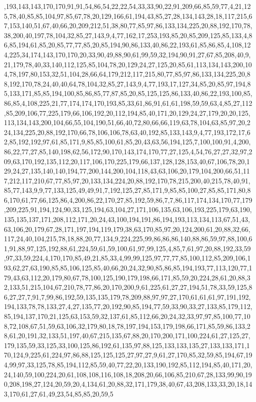 ,193,143,143,170,170,91,91,54,86,54,22,22,54,33,33,90,22,91,209,66,85,59,77,4,21,125,78,40,85,85,104,97,85,67,78,20,129,166,61,194,43,85,27,28,134,143,28,18,117,215,67,153,140,51,67,40,66,20,209,212,51,38,80,77,85,97,86,133,134,225,20,88,192,170,78,38,200,40,197,78,104,32,85,27,143,9,4,77,162,17,253,193,85,20,85,209,125,85,133,4,86,85,194,61,85,20,85,77,77,85,20,85,194,90,86,133,40,86,22,193,61,85,86,85,4,108,124,225,34,174,143,170,170,20,33,90,49,88,90,61,99,59,32,194,90,91,27,67,85,208,40,9,21,179,78,40,33,140,112,125,85,104,78,20,129,24,27,125,20,85,61,113,134,143,200,104,78,197,80,153,32,51,104,28,66,64,179,212,117,215,80,77,85,97,86,133,134,225,20,88,192,170,78,24,40,40,64,78,104,32,85,27,143,9,4,77,193,17,127,34,85,20,85,97,194,85,133,171,85,85,194,100,85,86,85,77,87,85,20,85,125,125,86,133,40,86,22,193,100,85,86,85,4,108,225,21,77,174,174,170,193,85,33,61,86,91,61,61,198,59,59,63,4,85,27,112,85,209,106,77,225,179,66,106,192,20,112,194,85,40,171,20,129,24,27,179,20,20,125,113,134,143,200,104,66,55,104,190,51,66,40,72,80,66,66,119,63,78,104,63,85,97,20,224,134,225,20,88,192,170,66,78,106,106,78,63,40,192,85,133,143,9,4,77,193,172,17,62,85,192,192,97,61,85,171,9,85,85,100,61,85,20,43,63,56,194,125,7,100,100,91,4,200,86,22,77,27,85,140,198,62,56,172,90,170,143,174,170,77,27,125,4,54,76,27,27,32,97,209,63,170,192,135,112,20,117,106,170,225,179,66,137,128,128,153,40,67,106,78,20,129,24,27,135,140,140,194,77,200,144,200,104,118,43,63,106,20,179,104,200,66,51,117,212,117,210,67,77,85,97,20,133,134,224,20,88,192,170,78,215,200,40,215,78,40,91,85,77,143,9,9,77,133,125,49,49,91,7,192,125,27,85,171,9,85,85,100,27,85,85,171,80,86,170,61,77,66,125,86,4,200,86,22,170,27,85,192,59,86,7,7,86,117,174,134,170,77,179,209,225,91,194,124,90,33,125,194,63,104,27,171,106,135,63,106,193,225,179,63,190,135,135,137,171,208,112,171,20,24,43,100,194,191,86,194,193,113,134,113,67,51,43,63,106,20,179,67,28,171,197,194,119,179,38,63,170,85,97,20,124,200,61,20,88,32,66,117,24,40,104,215,78,18,88,20,77,134,9,224,225,99,86,86,86,140,88,86,59,97,88,100,61,91,88,97,125,192,88,61,224,59,61,59,100,61,97,99,125,4,85,7,61,97,20,88,192,33,59,97,33,59,224,4,170,170,85,49,21,85,33,4,99,99,125,97,77,77,85,100,112,85,209,106,193,62,27,63,190,85,85,106,125,85,40,66,20,24,32,90,85,86,85,194,193,77,113,120,77,179,43,63,112,20,179,80,67,78,100,125,190,179,198,66,171,85,59,20,224,28,61,20,88,32,133,51,215,104,67,210,78,77,86,20,170,200,9,61,225,61,27,27,194,51,78,33,59,125,86,27,27,7,91,7,99,86,192,59,135,135,179,78,209,88,97,97,27,170,61,61,61,97,191,192,194,133,78,78,133,27,4,27,135,77,20,192,90,85,194,77,59,33,90,33,27,133,85,179,112,85,194,137,170,21,125,63,153,59,32,137,61,85,112,66,20,24,32,33,97,97,85,100,77,108,72,108,67,51,59,63,106,32,179,80,18,78,197,194,153,179,198,66,171,85,59,86,133,28,61,20,191,32,133,51,197,40,67,215,135,67,88,20,170,200,171,100,224,61,27,125,27,179,135,59,33,125,33,100,125,86,192,61,135,97,88,125,133,133,135,27,133,133,171,170,124,9,225,61,224,97,86,88,125,125,125,27,97,27,9,61,27,170,85,32,59,85,194,67,194,99,97,33,125,78,85,194,112,85,59,40,77,22,20,133,190,192,85,112,194,85,40,171,20,24,140,59,100,224,20,61,108,108,116,108,18,208,20,66,106,85,210,67,28,133,99,90,190,208,198,27,124,20,59,20,4,134,61,20,88,32,171,179,38,40,67,43,208,133,33,20,18,143,170,61,27,61,49,23,54,85,85,20,59,5
